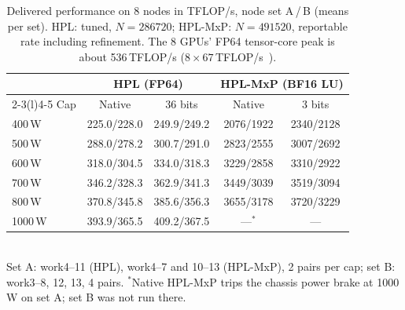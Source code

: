 \documentclass[conference]{IEEEtran}
\newcommand{\W}{\,W}
\begin{document}
\begin{table}[t]
\caption{Delivered performance on 8 nodes in TFLOP/s, node set A\,/\,B (means per set). HPL: tuned, $N=286720$;
HPL-MxP: $N=491520$, reportable rate including refinement. The 8 GPUs' FP64 tensor-core peak is about 536\,TFLOP/s
($8\times67$\,TFLOP/s~\cite{NVIDIAGH200}).}\label{tab:hplperf}
\centering\footnotesize\setlength{\tabcolsep}{3pt}
\begin{tabular}{@{}lcccc@{}}
\toprule
& \multicolumn{2}{c}{HPL (FP64)} & \multicolumn{2}{c}{HPL-MxP (BF16 LU)} \\
\cmidrule(lr){2-3}\cmidrule(l){4-5}
Cap & Native & 36 bits & Native & 3 bits \\
\midrule
400\W & 225.0/228.0 & 249.9/249.2 & 2076/1922 & 2340/2128 \\
500\W & 288.0/278.2 & 300.7/291.0 & 2823/2555 & 3007/2692 \\
600\W & 318.0/304.5 & 334.0/318.3 & 3229/2858 & 3310/2922 \\
700\W & 346.2/328.3 & 362.9/341.3 & 3449/3039 & 3519/3094 \\
800\W & 370.8/345.8 & 385.6/356.3 & 3655/3178 & 3720/3229 \\
1000\W & 393.9/365.5 & 409.2/367.5 & ---$^{*}$ & --- \\
\bottomrule
\end{tabular}
\\[2pt]{\scriptsize Set A: work4--11 (HPL), work4--7 and 10--13 (HPL-MxP), 2 pairs per cap; set B: work3--8, 12, 13, 4 pairs.
$^{*}$Native HPL-MxP trips the chassis power brake at 1000\W{} on set A; set B was not run there.}
\end{table}
\end{document}
